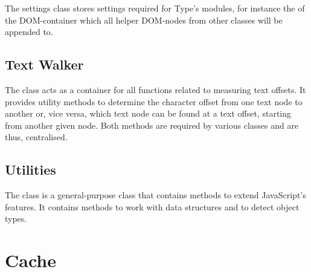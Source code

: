 The settings class stores settings required for Type's modules, for instance the  of the DOM-container which all helper DOM-nodes from other classes will be appended to.

\subsection{Text Walker}

The  class acts as a container for all functions related to measuring text offsets. It provides utility methods to determine the character offset from one text node to another or, vice versa, which text node can be found at a text offset, starting from another given node. Both methods are required by various classes and are thus, centralised. 

\subsection{Utilities}
\label{sec:utilities_class}
The  class is a general-purpose class that contains methods to extend JavaScript's features. It contains methods to work with data structures and to detect object types.

\section{Cache}
\label{sec:cache}

